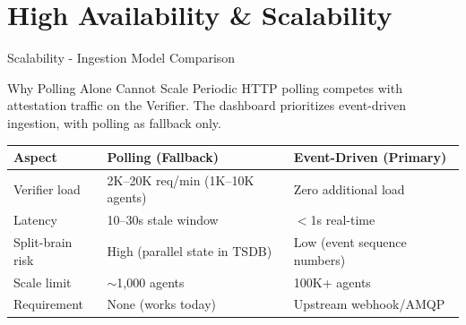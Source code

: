 \section{High Availability \& Scalability}

\begin{frame}{Scalability - Ingestion Model Comparison}
  \begin{block}{Why Polling Alone Cannot Scale}
    \scriptsize
    Periodic HTTP polling competes with attestation traffic on the Verifier.
    The dashboard prioritizes event-driven ingestion, with polling as fallback only.
  \end{block}

  \vspace{0.1cm}

  \scriptsize
  \begin{center}
    \begin{tabular}{|l|p{4cm}|p{4cm}|}
      \hline
      \textbf{Aspect} & \textbf{Polling (Fallback)} & \textbf{Event-Driven (Primary)} \\
      \hline
      \hline
      Verifier load & 2K--20K req/min (1K--10K agents) & Zero additional load \\
      \hline
      Latency & 10--30s stale window & $<$1s real-time \\
      \hline
      Split-brain risk & High (parallel state in TSDB) & Low (event sequence numbers) \\
      \hline
      Scale limit & $\sim$1,000 agents & 100K+ agents \\
      \hline
      Requirement & None (works today) & Upstream webhook/AMQP \\
      \hline
    \end{tabular}
  \end{center}

  \vspace{0.1cm}


\end{frame}
